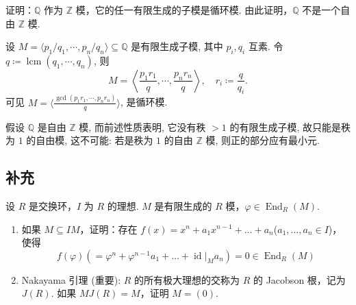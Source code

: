 \setcounter{pb}{20}
\begin{problem}
    证明：$ \mathbb{Q} $ 作为 $ \mathbb{Z} $ 模，它的任一有限生成的子模是循环模. 由此证明，$ \mathbb{Q} $ 不是一个自由 $ \mathbb{Z} $ 模. 
\end{problem}

\begin{solution}
    设 $M=\langle p_{1}/q_{1},\cdots,p_{n}/q_{n} \rangle \subseteq \mathbb{Q}$ 是有限生成子模, 其中 $p_{i},q_{i}$ 互素. 
    令 $q \coloneqq \operatorname{lcm}(q_{1},\cdots,q_{n})$, 则
        \[
            M=\left\langle \frac{p_{1}r_{1}}{q},\cdots,\frac{p_{n}r_{n}}{q} \right\rangle,\quad r_{i}\coloneqq \frac{q}{q_{i}}.
        \]
    可见 $M=\bigl\langle \frac{\gcd({p_{1}r_{1}},\cdots,{p_{n}r_{n}})}{q} \bigr\rangle$, 是循环模.
    \par 假设 $\mathbb{Q}$ 是自由 $\mathbb{Z}$ 模, 而前述性质表明, 它没有秩 $>1$ 的有限生成子模, 故只能是秩为 $1$ 的自由模, 这不可能: 若是秩为 $1$ 的自由 $\mathbb{Z}$ 模, 则正的部分应有最小元.
\end{solution}


\subsection{补充}

\setcounter{pb}{3}
\begin{problem}
    设 $ R $ 是交换环，$ I $ 为 $ R $ 的理想. $ M $ 是有限生成的 $ R $ 模，$ \varphi \in \operatorname{End}_R(M) $. 
    \begin{enumerate}[label=(\arabic*)]
        \item 如果 $ M \subseteq IM $，证明：存在 $ f(x) = x^n + a_1 x^{n-1} + \dots + a_n $($ a_1, \dots, a_n \in I $)，使得
              \[
                  f(\varphi) (= \varphi^n + \varphi^{n-1} a_1 + \dots + \operatorname{id} |_M a_n) = 0 \in \operatorname{End}_R(M)
              \]
        \item Nakayama 引理 (重要): $ R $ 的所有极大理想的交称为 $ R $ 的 Jacobson 根，记为 $ J(R) $. 如果 $ M J(R) = M $，证明 $ M = (0) $. 
    \end{enumerate}
\end{problem}

